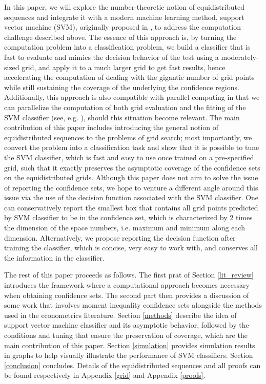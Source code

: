 \documentclass[12pt]{article}
\theoremstyle{definition}
\begin{document}
In this paper, we will explore the number-theoretic notion of equidistributed sequences and integrate it with a modern machine learning method, support vector machine (SVM), originally proposed in \cite{CV-1995}, to address the computation challenge described above. The essence of this approach is, by turning the computation problem into a classification problem, we build a classifier that is fast to evaluate and mimics the decision behavior of the test using a moderately-sized grid, and apply it to a much larger grid to get fast results, hence accelerating the computation of dealing with the gigantic number of grid points while still sustaining the coverage of the underlying the confidence regions. Additionally, this approach is also compatible with parallel computing in that we can parallelize the computation of both grid evaluation and the fitting of the SVM classifier (see, e.g. \cite{svm_parallel}), should this situation become relevant. The main contribution of this paper includes introducing the general notion of equidistributed sequences to the problems of grid search; most importantly, we convert the problem into a classification task and show that it is possible to tune the SVM classifier, which is fast and easy to use once trained on a pre-specified grid, such that it exactly preserves the asymptotic coverage of the confidence sets on the equidistributed grids. Although this paper does not aim to solve the issue of reporting the confidence sets, we hope to venture a different angle around this issue via the use of the decision function associated with the SVM classifier. One can conservatively report the smallest box that contains all grid points predicted by SVM classifier to be in the confidence set, which is characterized by 2 times the dimension of the space numbers, i.e. maximum and minimum along each dimension. Alternatively, we propose reporting the decision function after training the classifier, which is concise, very easy to work with, and conserves all the information in the classifier. 

The rest of this paper proceeds as follows. The first prat of Section \ref{lit_review} introduces the framework where a computational approach becomes necessary when obtaining confidence sets. The second part then provides a discussion of some work that involves moment inequality confidence sets alongside the methods used in the econometrics literature. Section \ref{methods} describe the idea of support vector machine classifier and its asymptotic behavior, followed by the conditions and tuning that ensure the preservation of coverage, which are the main contribution of this paper. Section \ref{simulation} provides simulation results in graphs to help visually illustrate the performance of SVM classifiers. Section \ref{conclusion} concludes. Details of the equidistributed sequences and all proofs can be found respectively in Appendix \ref{grid} and Appendix \ref{proofs}.
\end{document}
